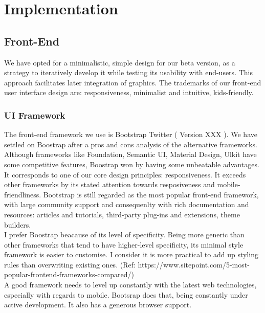 \chapter{Implementation}


\section{Front-End}

We have opted for a minimalistic, simple design for our beta version, as a strategy to iteratively develop it while testing its usability with end-users. This approach facilitates later integration of graphics. The trademarks of our front-end user interface design are: responsiveness, minimalist and intuitive, kids-friendly.\\

\subsection{UI Framework} 
The front-end framework we use is Bootstrap Twitter ( Version XXX ). We have settled on Boostrap after a pros and cons analysis of the alternative frameworks. Although frameworks like Foundation, Semantic UI, Material Design, Ulkit have some competitive features, Boostrap won by having some unbeatable advantages.
It corresponds to one of our core design principles: responsiveness. It exceeds other frameworks by its stated attention towards resposiveness and mobile-friendliness.
Bootstrap is still regarded as the most popular front-end framework, with large community support and consequenlty with rich documentation and resources: articles and tutorials, third-party plug-ins and extensions, theme builders.\\

I prefer Boostrap beacause of its level of specificity. Being more generic than other frameworks that tend to have higher-level specificity, its minimal style framework is easier to customise. I consider it is more practical to add up styling rules than overwriting existing ones. 
(Ref: https://www.sitepoint.com/5-most-popular-frontend-frameworks-compared/)\\

A good framework needs to level up constantly with the latest web technologies, especially with regards to mobile. Bootsrap does that, being constantly under active development. It also has a generous browser support.\\	

